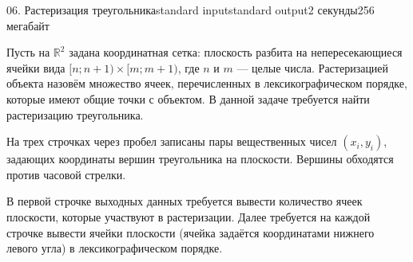 \begin{problem}{06. Растеризация треугольника}{standard input}{standard output}{2 секунды}{256 мегабайт}

Пусть на $\mathbb R^2$ задана координатная сетка: плоскость разбита на непересекающиеся ячейки вида $[n; n + 1) \times [m; m + 1)$, где $n$ и $m$ --- целые числа. Растеризацией объекта назовём множество ячеек, перечисленных в лексикографическом порядке, которые имеют общие точки с объектом. В данной задаче требуется найти растеризацию треугольника.

\InputFile

На трех строчках через пробел записаны пары вещественных чисел $(x_i, y_i)$, задающих координаты вершин треугольника на плоскости. Вершины обходятся против часовой стрелки.

\OutputFile

В первой строчке выходных данных требуется вывести количество ячеек плоскости, которые участвуют в растеризации. Далее требуется на каждой строчке вывести ячейки плоскости (ячейка задаётся координатами нижнего левого угла) в лексикографическом порядке.

\Examples

\begin{example}%
%
\end{example}

\end{problem}
